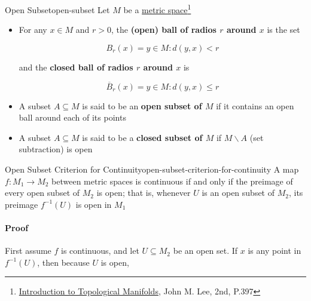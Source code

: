 \begin{Definition}{Open Subset}{open-subset}
    Let $M$ be a \hyperref[def:metrix-space]{metric space}\footnote{\href{https://trello.com/c/SI33o8fG}{Introduction to Topological Manifolds}, John M. Lee, 2nd, P.397}

    \begin{itemize}
        \item For any $x \in M$ and $r > 0$, the \textbf{(open) ball of radios $r$ around $x$} is the set

              \begin{equation}
                  B_r(x) = {y \in M : d(y, x) < r}
              \end{equation}

              and the \textbf{closed ball of radios $r$ around $x$} is

              \begin{equation}
                  \overline{B}_r(x) = {y \in M : d(y, x) \le r}
              \end{equation}

        \item A subset $A \subseteq M$ is said to be an \textbf{open subset of $M$} if it contains an open ball around
              each of its points
        \item A subset $A \subseteq M$ is said to be a \textbf{closed subset of $M$} if $M \smallsetminus A$ (set
              subtraction) is open
    \end{itemize}
\end{Definition}

\begin{Theorem}{Open Subset Criterion for Continuity}{open-subset-criterion-for-continuity}
    A map $f: M_1 \rightarrow M_2$ between metric spaces is continuous if and only if the preimage of every open subset
    of $M_2$ is open; that is, whenever $U$ is an open subset of $M_2$, its preimage $f^{-1}(U)$ is open in $M_1$
\end{Theorem}

\paragraph{Proof} First assume $f$ is continuous, and let $U \subseteq M_2$ be an open set. If $x$ is any point in
$f^{-1}(U)$, then because $U$ is open,


